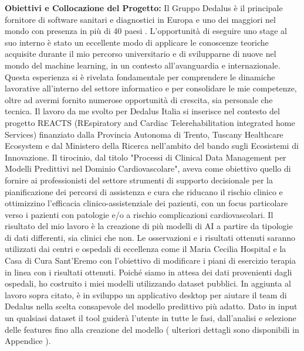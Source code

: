 \begin{flushleft}
\begin{flushleft}
\textbf{Obiettivi e Collocazione del Progetto:} \newline
Il Gruppo Dedalus è il principale fornitore di software sanitari e diagnostici in Europa e uno dei maggiori nel mondo con presenza in più di 40 paesi \cite{DedalusDescrizione}.
L'opportunità di eseguire uno stage al suo interno è stato un eccellente modo di applicare le conoscenze teoriche  acquisite  durante il mio percorso universitario e di svilupparne di nuove nel mondo del machine learning, in un contesto all'avanguardia e internazionale.
Questa esperienza si è rivelata fondamentale per comprendere le dinamiche lavorative all'interno del settore informatico e per consolidare le mie competenze, oltre ad avermi fornito numerose opportunità di crescita, sia personale che tecnica.
Il lavoro da me svolto per Dedalus Italia si inserisce nel contesto del progetto REACTS (REspiratory and Cardiac Telerehabilitation integrated home Services) finanziato dalla Provincia Autonoma di Trento, Tuscany Healthcare Ecosystem e  dal Ministero della Ricerca nell’ambito del bando sugli Ecosistemi di Innovazione. 
Il tirocinio, dal titolo "Processi di Clinical Data Management per Modelli Predittivi nel Dominio Cardiovascolare", aveva come obiettivo  quello di fornire ai professionisti del settore strumenti di supporto decisionale per la  pianificazione dei percorsi di assistenza e cura che riducano il rischio clinico e ottimizzino l’efficacia clinico-assistenziale dei pazienti, con un focus particolare verso i pazienti con patologie e/o a rischio complicazioni cardiovascolari.
Il risultato del mio lavoro è la creazione di più modelli di AI a partire da tipologie di dati differenti, sia clinici che non.
Le osservazioni e i risultati ottenuti saranno utilizzati dai centri e ospedali di eccellenza come il Maria Cecilia Hospital e la Casa di Cura Sant'Eremo con l'obiettivo di modificare i piani di esercizio terapia in linea con i risultati ottenuti.
Poiché siamo in attesa dei dati provenienti dagli ospedali, ho costruito i miei modelli utilizzando dataset pubblici.
In aggiunta al lavoro sopra citato, è in sviluppo un applicativo desktop per aiutare il team di Dedalus nella scelta consapevole del modello predittivo più adatto. 
Dato in input un qualsiasi dataset il tool guiderà l'utente in tutte le fasi, dall'analisi e selezione delle features fino alla creazione del modello ( ulteriori dettagli sono disponibili in Appendice ).



\end{flushleft}
\end{flushleft}
